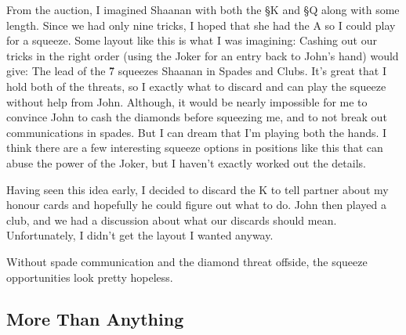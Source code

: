 \documentclass[a4paper]{JoshCards}
\begin{document}
From the auction, I imagined Shaanan with both the \S K and \S Q along with some length. Since we had only nine tricks, I hoped that she had the \C A so I could play for a squeeze. Some layout like this is what I was imagining:
\gamefont{\larger}
\westhand{}{}{}{}
\leftupper{}%
{}{}
\rightupper{}{}{}
\rightlower{}{}{}
\showAll*
Cashing out our tricks in the right order (using the Joker for an entry back to John's hand) would give:
\gamefont{\larger}
\westhand{}{}{}{}
\leftupper{}%
{}{}
\rightupper{}{}{}
\rightlower{}{}{}
\showAll*
The lead of the \H 7 squeezes Shaanan in Spades and Clubs. It's great that I hold both of the threats, so I exactly what to discard and can play the squeeze without help from John. Although, it would be nearly impossible for me to convince John to cash the diamonds before squeezing me, and to not break out communications in spades. But I can dream that I'm playing both the hands. I think there are a few interesting squeeze options in positions like this that can abuse the power of the Joker, but I haven't exactly worked out the details.

Having seen this idea early, I decided to discard the \C K to tell partner about my honour cards and hopefully he could figure out what to do. John then played a club, and we had a discussion about what our discards should mean. Unfortunately, I didn't get the layout I wanted anyway.

\gamefont{\larger}
\leftupper{}%
{}{}
\rightlower{}{}{}
\showAll*

Without spade communication and the diamond threat offside, the squeeze opportunities look pretty hopeless.


\newpage
\subsection*{More Than Anything}
\end{document}
